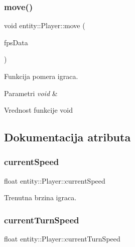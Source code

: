 \subsubsection{\texorpdfstring{move()}{move()}}
{\footnotesize\ttfamily void entity\+::\+Player\+::move (\begin{DoxyParamCaption}\item[{\hyperlink{classutility_1_1FpsData}{Fps\+Data} $\ast$}]{fps\+Data }\end{DoxyParamCaption})}



Funkcija pomera igraca. 


\begin{DoxyParams}{Parametri}
{\em void} & \\
\hline
\end{DoxyParams}
\begin{DoxyReturn}{Vrednost funkcije}
void 
\end{DoxyReturn}


\subsection{Dokumentacija atributa}
\mbox{\label{classentity_1_1Player_a06f0a95dc0b0efc3299a07f90e91dd25}} 
\subsubsection{\texorpdfstring{current\+Speed}{currentSpeed}}
{\footnotesize\ttfamily float entity\+::\+Player\+::current\+Speed\hspace{0.3cm}{\ttfamily [private]}}



Trenutna brzina igraca. 

\mbox{\label{classentity_1_1Player_afaac869e93409af86a6f6fc53a95687e}} 
\subsubsection{\texorpdfstring{current\+Turn\+Speed}{currentTurnSpeed}}
{\footnotesize\ttfamily float entity\+::\+Player\+::current\+Turn\+Speed\hspace{0.3cm}{\ttfamily [private]}}



